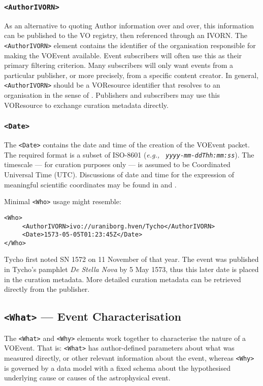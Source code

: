 \documentclass[11pt,a4paper]{ivoa}
\begin{document}
\subsubsection{\tt <AuthorIVORN>}
As an alternative to quoting Author information over and over, this information
can be published to the VO registry, then referenced through an IVORN. The {\tt
<AuthorIVORN>} element contains the identifier of the organisation responsible
for making the VOEvent available. Event subscribers will often use this as their
primary filtering criterion. Many subscribers will only want events from a
particular publisher, or more precisely, from a specific content creator. In
general, {\tt <AuthorIVORN>} should be a VOResource identifier that resolves to
an organisation in the sense of \citep{2007ivoa.spec.0302H}. Publishers and
subscribers may use this VOResource to exchange curation metadata directly.

\subsubsection{\tt <Date>}
The {\tt <Date>} contains the date and time of the creation of the VOEvent
packet. The required format is a subset of ISO-8601 (\emph{e.g., {\tt
yyyy-mm-ddThh:mm:ss}}). The timescale --- for curation purposes only --- is
assumed to be Coordinated Universal Time (UTC). Discussions of date and time for
the expression of meaningful scientific coordinates may be found in
\citet{2007ivoa.spec.1030R} and \citet{bib26}.


Minimal {\tt <Who>} usage might resemble:
\begin{lstlisting}
<Who>
     <AuthorIVORN>ivo://uraniborg.hven/Tycho</AuthorIVORN>
     <Date>1573-05-05T01:23:45Z</Date>
</Who>
\end{lstlisting}
Tycho first noted SN 1572 on 11 November of that year. The event was published
in Tycho's pamphlet \emph{De Stella Nova} by 5 May 1573, thus this later date is
placed in the curation metadata. More detailed curation metadata can be
retrieved directly from the publisher.


\subsection{{\tt <What>} --- Event Characterisation}
\label{sec:3.3}
The {\tt <What>} and {\tt <Why>} elements work together to characterise the
nature of a VOEvent. That is: {\tt <What>} has author-defined parameters about
what was measured directly, or other relevant information about the event,
whereas {\tt <Why>} is governed by a data model with a fixed schema about the hypothesised
underlying cause or causes of the astrophysical event.
\end{document}
